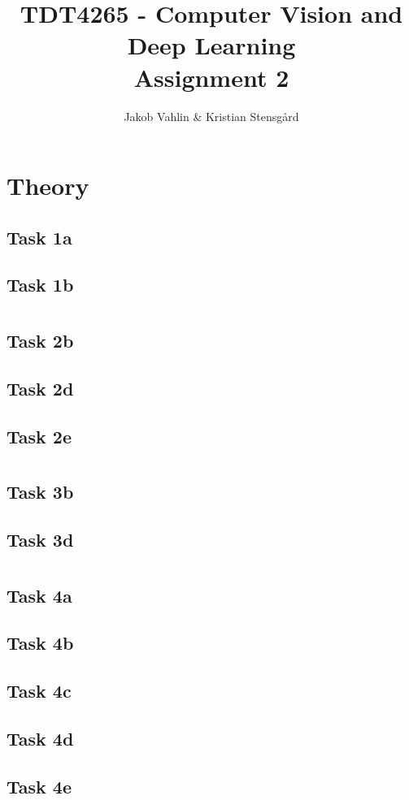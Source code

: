 \documentclass{article}
\date{}
\title{TDT4265 - Computer Vision and Deep Learning \\Assignment 2}
\author{Jakob Vahlin & Kristian Stensgård}
\begin{document}
\maketitle

\tableofcontents
\newpage

\section{Theory}
\subsection{Task 1a}



\subsection{Task 1b}


\section{}
\subsection{Task 2b}

\subsection{Task 2d}


\subsection{Task 2e}
\section{}
\subsection{Task 3b}


\subsection{Task 3d}

\section{}

\subsection{Task 4a}
\subsection{Task 4b}

\subsection{Task 4c}

\subsection{Task 4d}
\subsection{Task 4e}
\end{document}
